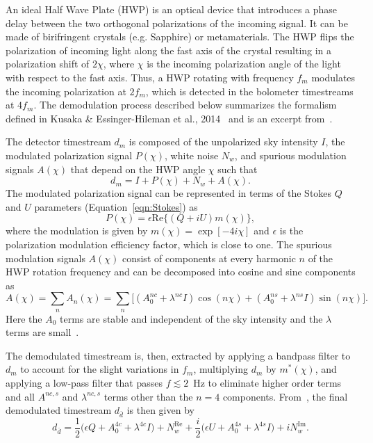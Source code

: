 An ideal Half Wave Plate (HWP) is an optical device that introduces a phase delay between the two orthogonal polarizations of the incoming signal. It can be made of birifringent crystals (e.g. Sapphire) or metamaterials. The HWP flips the polarization of incoming light along the fast axis of the crystal resulting in a polarization shift of $2\chi$, where $\chi$ is the incoming polarization angle of the light with respect to the fast axis. Thus, a HWP rotating with frequency $f_{m}$ modulates the incoming polarization at $2f_{m}$, which is detected in the bolometer timestreams at $4f_{m}$. The demodulation process described below summarizes the formalism defined in Kusaka \& Essinger-Hileman et al., 2014~\cite{ABS_HWP} and is an excerpt from~\cite{Simon_Thesis_2016}.

The detector timestream $d_{m}$ is composed of the unpolarized sky intensity $I$, the modulated polarization signal $P(\chi)$, white noise $N_{w}$, and spurious modulation signals $A(\chi)$ that depend on the HWP angle $\chi$ such that
\begin{equation}
d_{m}= I + P(\chi)+ N_{w} + A(\chi).
\end{equation}
The modulated polarization signal can be represented in terms of the Stokes $Q$ and $U$ parameters (Equation~\ref{eqn:Stokes}) as
\begin{equation}
P(\chi)=\epsilon \mathrm{Re}\{(Q+iU) m(\chi)\},
\end{equation}
where the modulation is given by $m(\chi)=\exp[-4 i \chi]$ and $\epsilon$ is the polarization modulation efficiency factor, which is close to one. The spurious modulation signals $A(\chi)$ consist of components at every harmonic $n$ of the HWP rotation frequency and can be decomposed into cosine and sine components as
\begin{equation}\label{eqn:achi}
A(\chi)= \sum_{n} A_n(\chi)=\sum_{n}\Big[ (A^{nc}_{0} + \lambda^{nc} I) \cos(n\chi) + (A^{ns}_{0} + \lambda^{ns} I) \sin(n\chi)    \Big].
\end{equation}
Here the $A_{0}$ terms are stable and independent of the sky intensity and the $\lambda$ terms are small~\cite{ABS_HWP}.

The demodulated timestream is, then, extracted by applying a bandpass filter to $d_{m}$ to account for the slight variations in $f_{m}$, multiplying $d_{m}$ by $m^*(\chi)$, and applying a low-pass filter that passes $f\lesssim2$~Hz to eliminate higher order terms and all $A^{nc,s}$ and $\lambda^{nc,s}$ terms other than the $n=4$ components. From~\cite{ABS_HWP}, the final demodulated timestream $d_{\bar{d}}$ is then given by
\begin{equation}
d_{\bar{d}}=\frac{1}{2}\Big(\epsilon Q + A^{4c}_{0} + \lambda^{4c} I \Big) + N^{\mathrm{Re}}_{w} + \frac{i}{2}\Big(\epsilon U + A^{4s}_{0} + \lambda^{4s} I \Big) + iN^{\mathrm{Im}}_{w}.
\end{equation}
